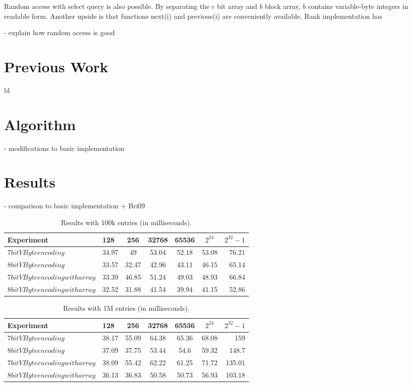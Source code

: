 Random access with select query is also possible.  By separating the $c$ bit array and $b$ block array, $b$ contains variable-byte integers 
in readable form. Another upside is that functions next(i) and previous(i) are conveniently available. Rank implementation has 

- explain how random access is good 

\chapter{Previous Work}
bl

\chapter{Algorithm}

 - modifications to basic implementation
 
\chapter{Results}
 - comparison to basic implementation + Bri09
\begin{table}
\centering
\caption{Results with 100k entries (in milliseconds).\label{table:results1}}
\begin{tabular}{l||l c c c c r} 
Experiment & 128 & 256 & 32768 & 65536 & $2^{24}$ & $2^{32} -1$\\ 
\hline \hline 
$7bit VByte encoding$ & 34.97 & 49 & 53.04 & 52.18 & 53.08 & 76.21\\
$8bit VByte encoding$ & 33.57 & 32.47 & 42.96 & 43.11 & 46.15 & 65.14\\
$7bit VByte encoding with array$ & 33.39 & 46.85 & 51.24 & 49.03 & 48.93 & 66.84 \\
$8bit VByte encoding with array$ & 32.52 & 31.88 & 41.54 & 39.94 & 41.15 & 52.86 \\

\hline
%
\end{tabular}
\end{table}

\begin{table}
\centering
\caption{Results with 1M entries (in milliseconds).\label{table:results2}}
\begin{tabular}{l||l c c c c r} 
Experiment & 128 & 256 & 32768 & 65536 & $2^{24}$ & $2^{32} -1$ \\ 
\hline \hline 
$7bit VByte encoding$ & 38.17 & 55.09 & 64.38 & 65.36 & 68.08 & 159 \\
$8bit VByte encoding$ & 37.09 & 37.75 & 53.44 & 54.6 & 59.32 & 148.7\\
$7bit VByte encoding with array$ & 38.09 & 55.42 & 62.22 & 61.25 & 71.72 & 135.01\\
$8bit VByte encoding with array$ & 36.13 & 36.83 & 50.58 & 50.73 & 56.93 & 103.18\\

\hline
%
\end{tabular}
\end{table}

